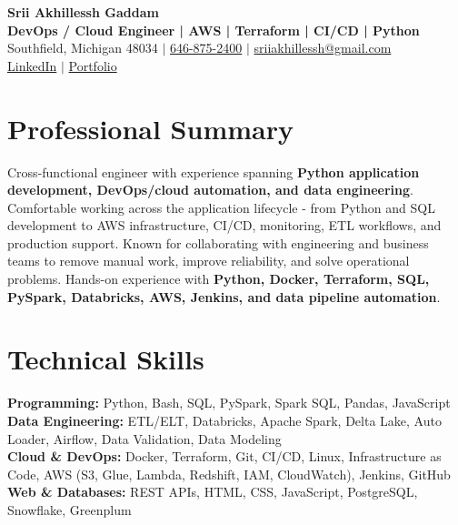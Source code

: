 \documentclass[letterpaper,10pt]{article}
\begin{document}
\fontsize{9.35pt}{10.45pt}\selectfont

\begin{center}
    {\LARGE \textbf{Srii Akhillessh Gaddam}} \\[-1pt]
    \textbf{DevOps / Cloud Engineer | AWS | Terraform | CI/CD | Python} \\[2pt]
    Southfield, Michigan 48034 $|$
    \href{tel:6468752400}{646-875-2400} $|$
    \href{mailto:sriiakhillessh@gmail.com}{sriiakhillessh@gmail.com} \\[1pt]
    \href{https://www.linkedin.com/in/srii-akhiilessh-gaddam-b48668191/}{LinkedIn} $|$
    \href{https://sriiakhillesshg.github.io/portfolio/}{Portfolio}
\end{center}
\vspace{-8pt}

\section{Professional Summary}
\small{Cross-functional engineer with experience spanning \textbf{Python application development, DevOps/cloud automation, and data engineering}. Comfortable working across the application lifecycle - from Python and SQL development to AWS infrastructure, CI/CD, monitoring, ETL workflows, and production support. Known for collaborating with engineering and business teams to remove manual work, improve reliability, and solve operational problems. Hands-on experience with \textbf{Python, Docker, Terraform, SQL, PySpark, Databricks, AWS, Jenkins, and data pipeline automation}.}

\section{Technical Skills}
\small{
\textbf{Programming:} Python, Bash, SQL, PySpark, Spark SQL, Pandas, JavaScript \\
\textbf{Data Engineering:} ETL/ELT, Databricks, Apache Spark, Delta Lake, Auto Loader, Airflow, Data Validation, Data Modeling \\
\textbf{Cloud \& DevOps:} Docker, Terraform, Git, CI/CD, Linux, Infrastructure as Code, AWS (S3, Glue, Lambda, Redshift, IAM, CloudWatch), Jenkins, GitHub \\
\textbf{Web \& Databases:} REST APIs, HTML, CSS, JavaScript, PostgreSQL, Snowflake, Greenplum
}
\end{document}
